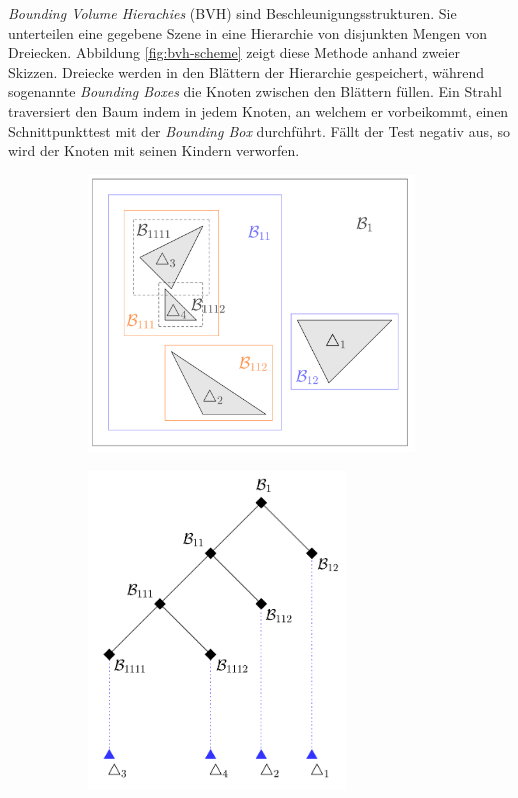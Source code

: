 \documentclass[crop=false]{standalone}
\begin{document}
      \textit{Bounding Volume Hierachies} (BVH) sind Beschleunigungsstrukturen.
      Sie unterteilen eine gegebene Szene in eine Hierarchie von disjunkten Mengen von Dreiecken.
      Abbildung \ref{fig:bvh-scheme} zeigt diese Methode anhand zweier Skizzen.
      Dreiecke werden in den Blättern der Hierarchie gespeichert, während sogenannte \textit{Bounding Boxes} die Knoten zwischen den Blättern füllen.
      Ein Strahl traversiert den Baum indem in jedem Knoten, an welchem er vorbeikommt, einen Schnittpunkttest mit der \textit{Bounding Box} durchführt.
      Fällt der Test negativ aus, so wird der Knoten mit seinen Kindern verworfen.
      \begin{figure}[h]
        \center
        \begin{subfigure}[b]{0.49\textwidth}
          \center
          \includegraphics[width=0.95\textwidth]{images/bvh_bounding_boxes.pdf}
        \end{subfigure}
        \begin{subfigure}[b]{0.49\textwidth}
          \center
          \includegraphics[width=0.75\textwidth]{images/bvh_tree.pdf}

\end{subfigure}
\end{figure}
\end{document}
